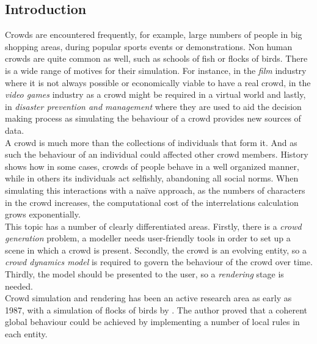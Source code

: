 \documentclass[6pt]{article} %
\begin{document}
\setcounter{page}{1} %
\columnsep 25.0pt %
\begin{multicols}{2} %

\section{Introduction}
\label{intro}

Crowds are encountered frequently, for example, large numbers of people in big shopping areas, during popular sports events or demonstrations.
Non human crowds are quite common as well, such as schools of fish or flocks of birds.
There is a wide range of motives for their simulation.
For instance, in the \textit{film} industry where it is not always possible or economically viable to have a real crowd, in the \textit{video games} industry as a crowd might be required in a virtual world and lastly, in \textit{disaster prevention and management} where they are used to aid the decision making process as simulating the behaviour of a crowd provides new sources of data.\\

A crowd is much more than the collections of individuals that form it.
And as such the behaviour of an individual could affected other crowd members.
History shows how in some cases, crowds of people behave in a well organized manner, while in others its individuals act selfishly, abandoning all social norms.
When simulating this interactions with a na\"ive approach, as the numbers of characters in the crowd increases, the computational cost of the interrelations calculation grows exponentially.\\

This topic has a number of clearly differentiated areas.
Firstly, there is a \textit{crowd generation} problem, a modeller needs user-friendly tools in order to set up a scene in which a crowd is present.
Secondly, the crowd is an evolving entity, so a \textit{crowd dynamics model} is required to govern the behaviour of the crowd over time.
Thirdly, the model should be presented to the user, so a \textit{rendering} stage is needed.\\

Crowd simulation and rendering has been an active research area as early as 1987, with a simulation of flocks of birds by \cite{Reynolds1987}.
The author proved that a coherent global behaviour could be achieved by implementing a number of local rules in each entity.


\end{multicols}
\end{document}
